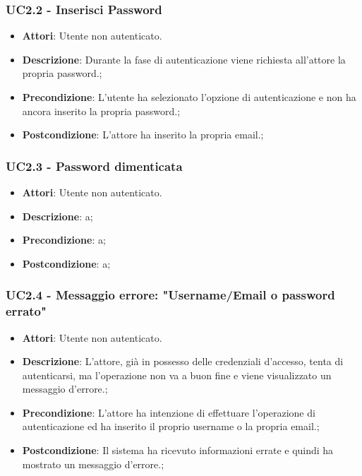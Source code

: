 \subsubsection{UC2.2 - Inserisci Password} 
\label{sssec:UC2.2} 
\begin{itemize} 
\item \textbf{Attori}: Utente non autenticato.
\item \textbf{Descrizione}: Durante la fase di autenticazione viene richiesta all'attore la propria password.;
\item \textbf{Precondizione}: L'utente ha selezionato l'opzione di autenticazione e non ha ancora inserito la propria password.;
\item \textbf{Postcondizione}: L'attore ha inserito la propria email.;
\end{itemize} 
\subsubsection{UC2.3 - Password dimenticata} 
\label{sssec:UC2.3} 
\begin{itemize} 
\item \textbf{Attori}: Utente non autenticato.
\item \textbf{Descrizione}: a;
\item \textbf{Precondizione}: a;
\item \textbf{Postcondizione}: a;
\end{itemize} 
\subsubsection{UC2.4 - Messaggio errore: "Username/Email o password errato"} 
\label{sssec:UC2.4} 
\begin{itemize} 
\item \textbf{Attori}: Utente non autenticato.
\item \textbf{Descrizione}: L'attore, già in possesso delle credenziali d'accesso, tenta di autenticarsi, ma l'operazione non va a buon fine e viene visualizzato un messaggio d'errore.;
\item \textbf{Precondizione}: L'attore ha intenzione di effettuare l'operazione di autenticazione ed ha inserito il proprio username o la propria email.;
\item \textbf{Postcondizione}: Il sistema ha ricevuto informazioni errate e quindi ha mostrato un messaggio d'errore.;
\end{itemize} 
